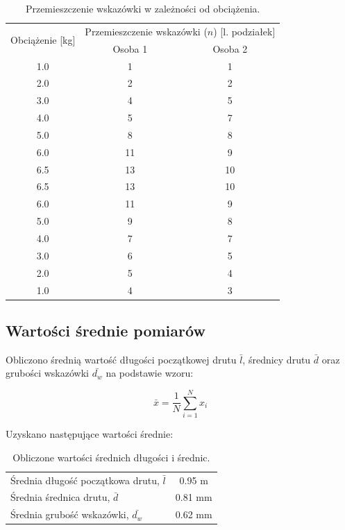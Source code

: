 \documentclass[a4paper,12pt]{article}
\begin{document}
\begin{table}[H]
    \centering
    \begin{tabular}{|c|c|c|}
        \hline
        \multirow{2}{*}{Obciążenie [kg]} & \multicolumn{2}{c|}{Przemieszczenie wskazówki ($n$) [l. podziałek]} \\
        \cline{2-3}
        & Osoba 1 & Osoba 2 \\
        \hline
        1.0 & 1  & 1  \\ \hline
        2.0 & 2  & 2  \\ \hline
        3.0 & 4  & 5  \\ \hline
        4.0 & 5  & 7  \\ \hline
        5.0 & 8  & 8  \\ \hline
        6.0 & 11 & 9  \\ \hline
        6.5 & 13 & 10 \\ \hline
        6.5 & 13 & 10 \\ \hline
        6.0 & 11 & 9  \\ \hline
        5.0 & 9  & 8  \\ \hline
        4.0 & 7  & 7  \\ \hline
        3.0 & 6  & 5  \\ \hline
        2.0 & 5  & 4  \\ \hline
        1.0 & 4  & 3  \\ \hline
    \end{tabular}
    \caption{Przemieszczenie wskazówki w zależności od obciążenia.}
    \label{tab:pozycja_wskazowki}
\end{table}

\subsection{Wartości średnie pomiarów}

Obliczono średnią wartość długości początkowej drutu $\bar{l}$, średnicy drutu $\bar{d}$ oraz grubości wskazówki $\bar{d_w}$ na podstawie wzoru:

\begin{equation}
    \bar{x} = \frac{1}{N} \sum_{i=1}^{N} x_i
\end{equation}

Uzyskano następujące wartości średnie:

\begin{table}[h]
    \centering
    \begin{tabular}{l c}
        \toprule
        Średnia długość początkowa drutu, $\bar{l}$ & 0.95 m \\
        Średnia średnica drutu, $\bar{d}$ & 0.81 mm \\
        Średnia grubość wskazówki, $\bar{d_w}$ & 0.62 mm \\
        \bottomrule
    \end{tabular}
    \caption{Obliczone wartości średnich długości i średnic.}
    \label{tab:srednie_wartosci}
\end{table}
\end{document}
